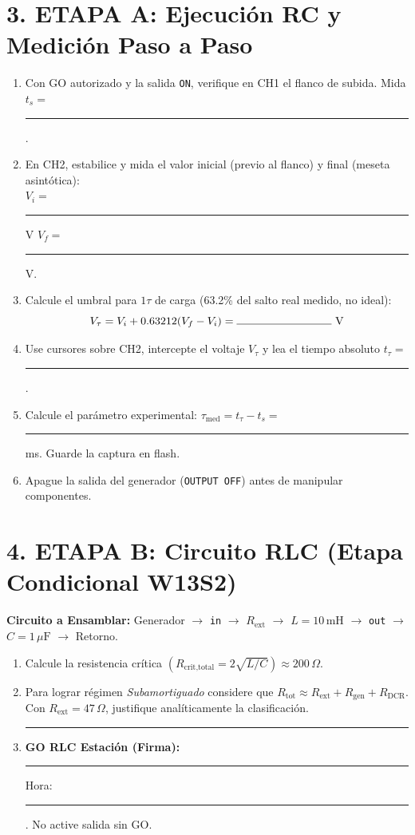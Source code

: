 \documentclass[11pt, a4paper]{article}
\begin{document}
\section*{3. ETAPA A: Ejecución RC y Medición Paso a Paso}
\begin{enumerate}\setlength\itemsep{0.25cm}
    \item Con GO autorizado y la salida \texttt{ON}, verifique en CH1 el flanco de subida. Mida $t_s =$ \rule{2cm}{0.4pt}.
    \item En CH2, estabilice y mida el valor inicial (previo al flanco) y final (meseta asintótica): \\
    $V_i =$ \rule{2cm}{0.4pt} V \quad $V_f =$ \rule{2cm}{0.4pt} V.
    \item Calcule el umbral para $1\tau$ de carga (63.2\% del salto real medido, no ideal): \\
    $$V_{\tau} = V_i + 0.63212(V_f - V_i) = \rule{3cm}{0.4pt} \text{ V} $$
    \item Use cursores sobre CH2, intercepte el voltaje $V_{\tau}$ y lea el tiempo absoluto $t_{\tau} =$ \rule{2cm}{0.4pt}.
    \item Calcule el parámetro experimental: $\tau_{\text{med}} = t_{\tau} - t_s = $ \rule{2.5cm}{0.4pt} ms. Guarde la captura en flash.
    \item Apague la salida del generador (\texttt{OUTPUT OFF}) antes de manipular componentes.
\end{enumerate}

\section*{4. ETAPA B: Circuito RLC (Etapa Condicional W13S2)}
\noindent\textbf{Circuito a Ensamblar:} Generador $\to$ \texttt{in} $\to$ $R_{\text{ext}}$ $\to$ $L = 10\,\text{mH}$ $\to$ \texttt{out} $\to$ $C = 1\,\mu\text{F}$ $\to$ Retorno.
\begin{enumerate}\setlength\itemsep{0.2cm}
    \item Calcule la resistencia crítica $\left( R_{\text{crit,total}} = 2\sqrt{L/C} \right) \approx 200\,\Omega$.
    \item Para lograr régimen \textit{Subamortiguado} considere que $R_{\text{tot}} \approx R_{\text{ext}} + R_{\text{gen}} + R_{\text{DCR}}$. Con $R_{\text{ext}}=47\,\Omega$, justifique analíticamente la clasificación. \rule{6.5cm}{0.4pt}
    \item \textbf{GO RLC Estación (Firma):} \rule{4cm}{0.4pt} \quad Hora: \rule{2cm}{0.4pt}. No active salida sin GO.
\end{enumerate}
\end{document}

